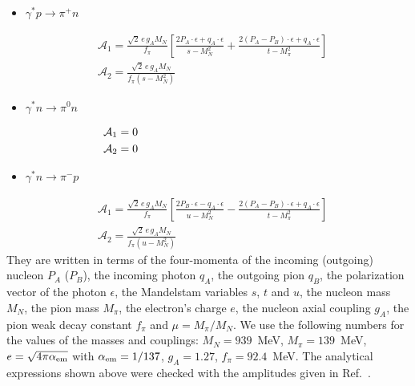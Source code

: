 \documentclass[twocolumn,prc,showpacs,nofootinbib,preprintnumbers,amsmath,amssymb,superscriptaddress]{revtex4-1}
\begin{document}
\begin{itemize}
 \item $\gamma^* p \to \pi^+ n$
\end{itemize}
\begin{align}
  &\mathcal{A}_1= \frac{\sqrt{2}\, e\, g_A M_N}{f_\pi}\left[\frac{2 P_A\cdot \epsilon + q_A\cdot \epsilon}{s-M_N^2} + \frac{2 (P_A - P_B)\cdot \epsilon + q_A\cdot \epsilon}{t-M_\pi^2}\right]\\
   &\mathcal{A}_2=\frac{\sqrt{2}\, e\, g_A M_N}{f_\pi(s-M_N^2)}
\end{align}


\begin{itemize}
 \item $\gamma^* n \to \pi^0 n$
\end{itemize}
\begin{align}
  &\mathcal{A}_1= 0\hspace{5.5cm}\\
   &\mathcal{A}_2=0
\end{align}


\begin{itemize}
 \item $\gamma^* n \to \pi^- p$
\end{itemize}
\begin{align}
  &\mathcal{A}_1= \frac{\sqrt{2}\, e\, g_A M_N}{f_\pi}\left[\frac{2 P_B\cdot \epsilon - q_A\cdot \epsilon}{u-M_N^2}  - \frac{2 (P_A - P_B)\cdot \epsilon + q_A\cdot \epsilon}{t-M_\pi^2}\right]\\
   &\mathcal{A}_2=\frac{\sqrt{2}\, e\, g_A M_N}{f_\pi(u-M_N^2)}
\end{align}
They are written in terms of the four-momenta of the incoming (outgoing) nucleon $P_A$ ($P_B$), the incoming photon $q_A$, the outgoing pion $q_B$, the polarization vector of the photon $\epsilon$, the Mandelstam variables $s$, $t$ and $u$, the nucleon mass $M_N$, the pion mass $M_\pi$, the electron's charge $e$, the nucleon axial coupling $g_A$, the pion weak decay constant $f_\pi$ and $\mu=M_\pi/M_N$. We use the following numbers for the values of the masses and couplings: $M_N=939$~MeV, $M_\pi=139$~MeV, $e=\sqrt{4\pi \alpha_{\rm em}}$ with $\alpha_{\rm em}=1/137$, $g_A=1.27$, $f_\pi=92.4$~MeV.
The analytical expressions shown above were checked with the amplitudes given in Ref.~\cite{Pasquini:2007fw}.
\end{document}
